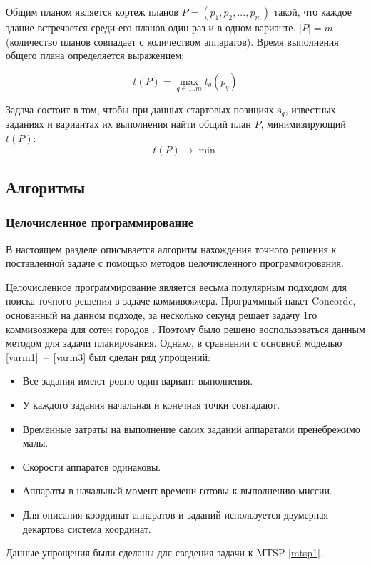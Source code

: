\documentclass[a4paper,14pt,russian]{article}
\begin{document}
Общим планом является кортеж планов $P = (p_1, p_2, ..., p_m)$ такой, что каждое здание встречается среди его планов один раз и в одном варианте. $|P| = m$ (количество планов совпадает с количеством аппаратов). Время выполнения общего плана определяется выражением:

\begin{equation} \label{varm2}
t(P) = \displaystyle \max_{q \in 1..m} t_q(p_q)
\end{equation}

Задача состоит в том, чтобы при данных стартовых позициях $\mathbf{s}_q$, известных заданиях и вариантах их выполнения найти общий план $P$, минимизирующий $t(P)$:
\begin{equation} \label{varm3}
t(P) \rightarrow \min
\end{equation}


\subsection{Алгоритмы}
\subsubsection{Целочисленное программирование}

В настоящем разделе описывается алгоритм нахождения точного решения к поставленной задаче с помощью методов целочисленного программирования.

Целочисленное программирование является весьма популярным подходом для поиска точного решения в задаче коммивояжера.
Программный пакет Concorde, основанный на данном подходе, за несколько секунд решает задачу 1го коммивояжера для сотен городов \cite{applegate1999concorde}.
Поэтому было решено воспользоваться данным методом для задачи планирования. Однако, в сравнении с основной моделью \eqref{varm1}~--~\eqref{varm3} был сделан ряд упрощений:

\begin{itemize}
\item Все задания имеют ровно один вариант выполнения.
\item У каждого задания начальная и конечная точки совпадают.
\item Временные затраты на выполнение самих заданий аппаратами пренебрежимо малы.
\item Скорости аппаратов одинаковы.
\item Аппараты в начальный момент времени готовы к выполнению миссии.
\item Для описания координат аппаратов и заданий используется двумерная декартова система координат.
\end{itemize}
Данные упрощения были сделаны для сведения задачи к MTSP \eqref{mtsp1}.
\end{document}
